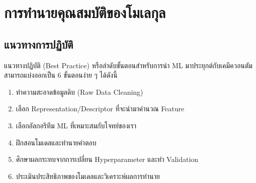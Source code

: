 

\chapter{การทำนายคุณสมบัติของโมเลกุล}
\label{ch:predict_molprop}

\section{แนวทางการปฏิบัติ}

แนวทางปฏิบัติ (Best Practice) หรือลำดับขั้นตอนสำหรับการนำ ML มาประยุกต์กับเคมีควอนตัมสามารถแบ่งออกเป็น 6 ขั้นตอนง่าย ๆ ได้ดังนี้

\begin{enumerate}
    \item ทำความสะอาดข้อมูลดิบ (Raw Data Cleaning)
    \item เลือก Representation/Descriptor ที่จะนำมาคำนวณ Feature 
    \item เลือกอัลกอริทึม ML ที่เหมาะสมกับโจทย์ของเรา 
    \item ฝึกสอนโมเดลและทำนายคำตอบ
    \item ศึกษาผลกระทบจากการเปลี่ยน Hyperparameter และทำ Validation
    \item ประเมินประสิทธิภาพของโมเดลและวิเคราะห์ผลการทำนาย
\end{enumerate}

